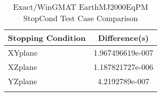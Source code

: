 \begin{table}[htbp!]
\centering
\caption{ Exact/WinGMAT EarthMJ2000EqPM StopCond Test Case Comparison}
      \begin{tabular}{lc}
      \hline\hline
          Stopping Condition & Difference(s) \\
         \hline
         XYplane & 1.967496619e-007 \\
         XZplane & 1.187821727e-006 \\
         YZplane & 4.2192789e-007 \\
      \hline\hline
      \label{Table: Exact-WinGMAT EarthMJ2000EqPM StopCond Table} 
\end{tabular}
\end{table}
